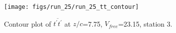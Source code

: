 \begin{figure}[H]
\centering
\texttt{[image: figs/run\_25/run\_25\_tt\_contour]}
\caption{Contour plot of $\overline{t^\prime t^\prime}$ at $z/c$=7.75, $V_{free}$=23.15, station 3.}
\label{fig:run_25_tt_contour}
\end{figure}



